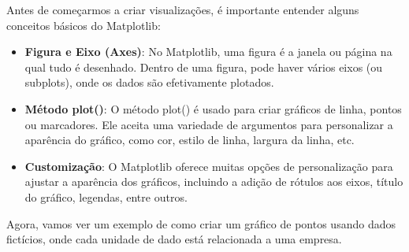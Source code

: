 \documentclass[
  portuguese,
  letterpaper,
  DIV=11,
  numbers=noendperiod]{scrreprt}
\theoremstyle{definition}
\theoremstyle{remark}
\begin{document}
Antes de começarmos a criar visualizações, é importante entender alguns
conceitos básicos do Matplotlib:

\begin{itemize}
\item
  \textbf{Figura e Eixo (Axes)}: No Matplotlib, uma figura é a janela ou
  página na qual tudo é desenhado. Dentro de uma figura, pode haver
  vários eixos (ou subplots), onde os dados são efetivamente plotados.
\item
  \textbf{Método plot()}: O método plot() é usado para criar gráficos de
  linha, pontos ou marcadores. Ele aceita uma variedade de argumentos
  para personalizar a aparência do gráfico, como cor, estilo de linha,
  largura da linha, etc.
\item
  \textbf{Customização}: O Matplotlib oferece muitas opções de
  personalização para ajustar a aparência dos gráficos, incluindo a
  adição de rótulos aos eixos, título do gráfico, legendas, entre
  outros.
\end{itemize}

Agora, vamos ver um exemplo de como criar um gráfico de pontos usando
dados fictícios, onde cada unidade de dado está relacionada a uma
empresa.
\end{document}
